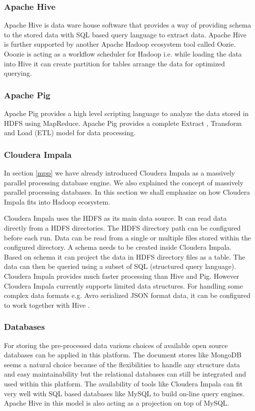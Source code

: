 \subsubsection{Apache Hive}
Apache Hive \cite{hive} is data ware house software that provides a way of providing schema to the stored data with SQL based query language to extract data. Apache Hive is further supported by another Apache Hadoop ecosystem tool called Oozie. Ooozie is acting as a workflow scheduler for Hadoop i.e. while loading the data into Hive it can create partition for tables arrange the data for optimized querying.
\subsubsection{Apache Pig}
Apache Pig \cite{pig}  provides a high level scripting language to analyze the data stored in HDFS using MapReduce. Apache Pig provides a complete Extract , Transform and Load (ETL) model for data processing.
\subsubsection{Cloudera Impala}
In section \ref{mpp} we have already introduced Cloudera Impala as a massively parallel processing database engine. We also  explained the concept of massively parallel processing databases. In this section we shall emphasize on how Cloudera Impala fits into Hadoop ecosystem.
 
Cloudera Impala uses the HDFS as its main data source. It can read data directly from a HDFS directories. The HDFS directory path can be configured before each run. Data can be read from a single or multiple files stored within the configured directory. A schema needs to be created inside Cloudera Impala. Based on schema it can project the data in HDFS directory files as a table. The data can then be queried using a subset of SQL (structured query language). Cloudera Impala provides much faster processing than Hive and Pig. However Cloudera Impala currently supports limited data structures. For handling some complex data formats e.g. Avro serialized JSON format data, it can be configured to work together with Hive \cite{cimpala}. 

\subsubsection{Databases}
For storing the pre-processed data various choices of available open source databases can be applied in this platform. The document stores like MongoDB seems a natural choice because of the flexibilities to handle any structure data and easy maintainability but the relational databases can still be integrated and used within this platform. The availability of tools like Cloudera Impala can fit very well with SQL based databases like MySQL to build on-line query engines. Apache Hive in this model is also acting as a projection on top of MySQL.

